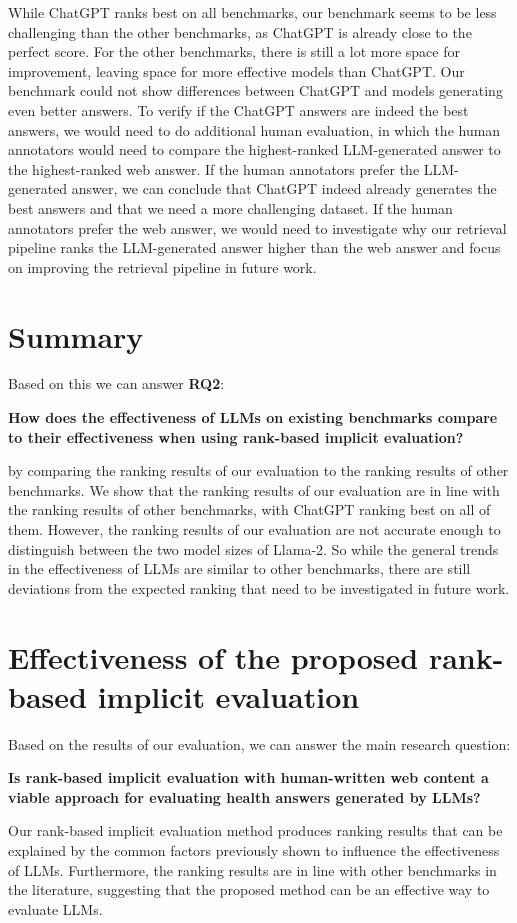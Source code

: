 While ChatGPT ranks best on all benchmarks, our benchmark seems to be less challenging than the other benchmarks, as ChatGPT is already close to the perfect score.
For the other benchmarks, there is still a lot more space for improvement, leaving space for more effective models than ChatGPT.
Our benchmark could not show differences between ChatGPT and models generating even better answers.
To verify if the ChatGPT answers are indeed the best answers, we would need to do additional human evaluation, in which the human annotators would need to compare the highest-ranked LLM-generated answer to the highest-ranked web answer.
If the human annotators prefer the LLM-generated answer, we can conclude that ChatGPT indeed already generates the best answers and that we need a more challenging dataset.
If the human annotators prefer the web answer, we would need to investigate why our retrieval pipeline ranks the LLM-generated answer higher than the web answer and focus on improving the retrieval pipeline in future work.

\section{Summary}
Based on this we can answer \textbf{RQ2}:
\begin{center}
    \textbf{How does the effectiveness of LLMs on existing benchmarks compare to their effectiveness when using rank-based implicit evaluation?}
\end{center}
by comparing the ranking results of our evaluation to the ranking results of other benchmarks.
We show that the ranking results of our evaluation are in line with the ranking results of other benchmarks, with ChatGPT ranking best on all of them.
However, the ranking results of our evaluation are not accurate enough to distinguish between the two model sizes of Llama-2.
So while the general trends in the effectiveness of LLMs are similar to other benchmarks, there are still deviations from the expected ranking that need to be investigated in future work.

\section{Effectiveness of the proposed rank-based implicit evaluation}
Based on the results of our evaluation, we can answer the main research question:
\begin{center}
    \textbf{Is rank-based implicit evaluation with human-written web content a viable approach for evaluating health answers generated by LLMs?}
\end{center}
Our rank-based implicit evaluation method produces ranking results that can be explained by the common factors previously shown to influence the effectiveness of LLMs.
Furthermore, the ranking results are in line with other benchmarks in the literature, suggesting that the proposed method can be an effective way to evaluate LLMs.

